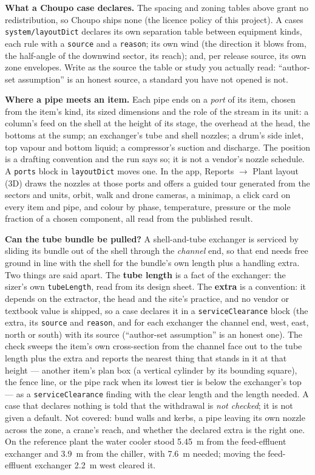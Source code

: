 \documentclass[11pt,a4paper]{article}
\begin{document}
\textbf{What a Choupo case declares.} The spacing and zoning tables
above grant no redistribution, so Choupo ships none (the licence policy
of this project). A case\textquotesingle s \texttt{system/layoutDict}
declares its own separation table between equipment kinds, each rule
with a \texttt{source} and a \texttt{reason}; its own wind (the direction
it blows from, the half-angle of the downwind sector, its reach); and,
per release source, its own zone envelopes. Write as the source the table
or study you actually read: ``author-set assumption'' is an honest
source, a standard you have not opened is not.

\textbf{Where a pipe meets an item.} Each pipe ends on a \emph{port} of
its item, chosen from the item's kind, its sized dimensions and the role
of the stream in its unit: a column's feed on the shell at the height of
its stage, the overhead at the head, the bottoms at the sump; an
exchanger's tube and shell nozzles; a drum's side inlet, top vapour and
bottom liquid; a compressor's suction and discharge. The position is a
drafting convention and the run says so; it is not a vendor's nozzle
schedule. A \texttt{ports} block in \texttt{layoutDict} moves one. In the
app, Reports $\rightarrow$ Plant layout (3D) draws the nozzles at those
ports and offers a guided tour generated from the sectors and units,
orbit, walk and drone cameras, a minimap, a click card on every item and
pipe, and colour by phase, temperature, pressure or the mole fraction of
a chosen component, all read from the published result.

\textbf{Can the tube bundle be pulled?} A shell-and-tube exchanger is
serviced by sliding its bundle out of the shell through the \emph{channel}
end, so that end needs free ground in line with the shell for the
bundle's own length plus a handling extra. Two things are said apart. The
\textbf{tube length} is a fact of the exchanger: the sizer's own
\texttt{tubeLength}, read from its design sheet. The \textbf{extra} is a
convention: it depends on the extractor, the head and the site's practice,
and no vendor or textbook value is shipped, so a case declares it in a
\texttt{serviceClearance} block (the extra, its \texttt{source} and
\texttt{reason}, and for each exchanger the channel end, west, east, north
or south) with its source (``author-set assumption'' is an honest one). The
check sweeps the item's own cross-section from the channel face out to the
tube length plus the extra and reports the nearest thing that stands in it
at that height --- another item's plan box (a vertical cylinder by its
bounding square), the fence line, or the pipe rack when its lowest tier is
below the exchanger's top --- as a \texttt{serviceClearance} finding with
the clear length and the length needed. A case that declares nothing is
told that the withdrawal is \emph{not checked}; it is not given a default.
Not covered: bund walls and kerbs, a pipe leaving its own nozzle across the
zone, a crane's reach, and whether the declared extra is the right one. On
the reference plant the water cooler stood 5.45~m from the feed-effluent
exchanger and 3.9~m from the chiller, with 7.6~m needed; moving the
feed-effluent exchanger 2.2~m west cleared it.
\end{document}
